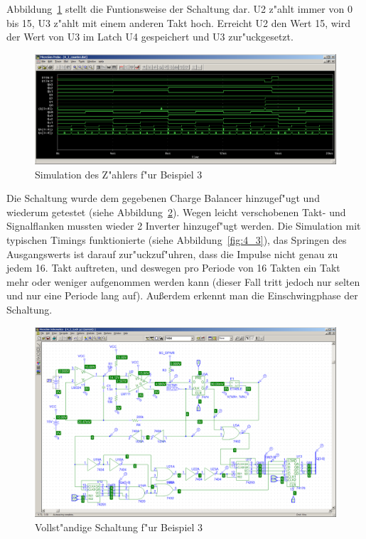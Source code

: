 Abbildung~\ref{fig:4_3_counter} stellt die Funtionsweise der Schaltung dar. U2 z"ahlt immer von 0 bis 15, U3 z"ahlt mit einem anderen Takt hoch. Erreicht U2 den Wert 15, wird der Wert von U3 im Latch U4 gespeichert und U3 zur"uckgesetzt.

\begin{figure}[ht]
 \centering
 \includegraphics[width=\textwidth]{./img/4_3_counter.PNG}
 \caption{Simulation des Z"ahlers f"ur Beispiel 3}
 \label{fig:4_3_counter}
\end{figure}

Die Schaltung wurde dem gegebenen Charge Balancer hinzugef"ugt und wiederum getestet (siehe Abbildung~\ref{fig:4_3_schem}). Wegen leicht verschobenen Takt- und Signalflanken mussten wieder 2 Inverter hinzugef"ugt werden. Die Simulation mit typischen Timings funktionierte (siehe Abbildung~\ref{fig:4_3}), das Springen des Ausgangswerts ist darauf zur"uckzuf"uhren, dass die Impulse nicht genau zu jedem 16. Takt auftreten, und deswegen pro Periode von 16 Takten ein Takt mehr oder weniger aufgenommen werden kann (dieser Fall tritt jedoch nur selten und nur eine Periode lang auf). Au\ss{}erdem erkennt man die Einschwingphase der Schaltung.

\begin{figure}[ht]
 \centering
 \includegraphics[width=\textwidth]{./img/4_3_schem.PNG}
 \caption{Vollst"andige Schaltung f"ur Beispiel 3}
 \label{fig:4_3_schem}
\end{figure}

